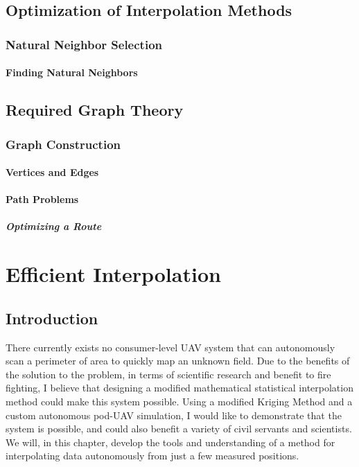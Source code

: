 \documentclass[11pt]{ucthesis}
\begin{document}
\chapter{Optimization of Interpolation Methods}
\section{Natural Neighbor Selection}
\subsection{Finding Natural Neighbors}

\chapter{Required Graph Theory}
\section{Graph Construction}
\subsection{Vertices and Edges}
\subsection{Path Problems}
\subsubsection{Optimizing a Route}

\part{Efficient Interpolation}

\chapter{Introduction}
There currently exists no consumer-level UAV system that can autonomously scan a perimeter of area to quickly map an unknown field. Due to the benefits of the solution to the problem, in terms of scientific research and benefit to fire fighting, I believe that designing a modified mathematical statistical interpolation method could make this system possible. Using a modified Kriging Method and a custom autonomous pod-UAV simulation, I would like to demonstrate that the system is possible, and could also benefit a variety of civil servants and scientists. We will, in this chapter, develop the tools and understanding of a method for interpolating data autonomously from just a few measured positions.
\end{document}
